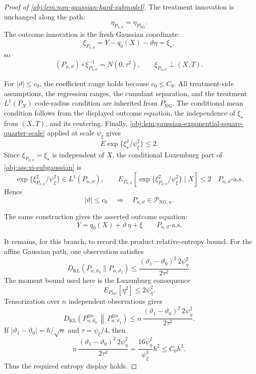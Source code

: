 \documentclass[11pt]{article}
\begin{document}
\begin{proof}[Proof of \cref{obj:lem:non-gaussian-hard-submodel}]
The treatment innovation is unchanged along the path:
\[
\eta_{P_{n,\vartheta}}=\eta_{P_{\mathrm{NG}}^\circ}.
\]
The outcome innovation is the fresh Gaussian coordinate:
\[
\xi_{P_{n,\vartheta}}
=
Y-q_0(X)-\vartheta\eta
=
\xi_\star,
\]
so
\[
(P_{n,\vartheta})\circ \xi_{P_{n,\vartheta}}^{-1}
=
N(0,\tau^2),
\qquad
\xi_{P_{n,\vartheta}}\perp (X,T).
\]

For \(|\vartheta|\le c_0\), the coefficient range holds because \(c_0\le C_{\theta}\).  All treatment-side assumptions, the regression ranges, the cumulant separation, and the treatment \(L^1(P_X)\) code-radius condition are inherited from \(P_{\mathrm{NG}}^\circ\).  The conditional mean condition follows from the displayed outcome equation, the independence of \(\xi_\star\) from \((X,T)\), and its centering.  Finally, \cref{obj:lem:gaussian-exponential-square-quarter-scale} applied at scale \(\psi_\xi\) gives
\[
E\exp\{\xi_\star^2/\psi_\xi^2\}\le2.
\]
Since \(\xi_{P_{n,\vartheta}}=\xi_\star\) is independent of \(X\), the conditional Luxemburg part of \cref{obj:ass:xi-subgaussian} is
\[
\exp\{\xi_{P_{n,\vartheta}}^2/\psi_\xi^2\}\in L^1(P_{n,\vartheta}),
\qquad
E_{P_{n,\vartheta}}\!\left[
\exp\{\xi_{P_{n,\vartheta}}^2/\psi_\xi^2\}\mid X
\right]
\le 2
\quad P_{n,\vartheta}\text{-a.s.}
\]
Hence
\[
|\vartheta|\le c_0
\quad\Longrightarrow\quad
P_{n,\vartheta}\in\mathcal P_{\mathrm{NG},n}.
\]

The same construction gives the asserted outcome equation:
\[
Y=q_0(X)+\vartheta\,\eta+\xi
\qquad P_{n,\vartheta}\text{-a.s.}
\]

It remains, for this branch, to record the product relative-entropy bound.  For the affine Gaussian path, one observation satisfies
\[
D_{\mathrm{KL}}(P_{n,\vartheta_0}\|P_{n,\vartheta_1})
\le
\frac{(\vartheta_1-\vartheta_0)^2\,2\psi_{\eta}^2}{2\tau^2}.
\]
The moment bound used here is the Luxemburg consequence
\[
E_{P_{\mathrm{NG}}^\circ}[\eta^2]\le 2\psi_{\eta}^2 .
\]
Tensorization over \(n\) independent observations gives
\[
D_{\mathrm{KL}}\!\left(P_{n,\vartheta_0}^{\otimes n}\,\middle\|\,P_{n,\vartheta_1}^{\otimes n}\right)
\le
n\,\frac{(\vartheta_1-\vartheta_0)^2\,2\psi_{\eta}^2}{2\tau^2}.
\]
If \(|\vartheta_1-\vartheta_0|=h/\sqrt n\) and \(\tau=\psi_\xi/4\), then
\[
n\,\frac{(\vartheta_1-\vartheta_0)^2\,2\psi_{\eta}^2}{2\tau^2}
=
\frac{16\psi_{\eta}^2}{\psi_\xi^2}h^2
\le C_0h^2 .
\]
Thus the required entropy display holds. %


\end{proof}
\end{document}
